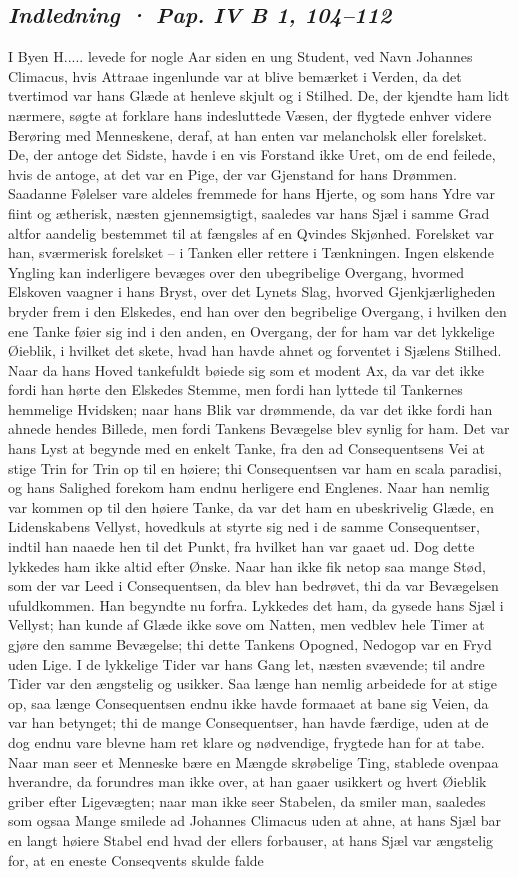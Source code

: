 \documentclass[12pt,a4paper]{article}
\newcommand{\sectionheading}[1]{\subsection*{\normalfont\itshape #1}}
\begin{document}
\sectionheading{Indledning  ·  Pap. IV B 1, 104–112}

I Byen H..... levede for nogle Aar siden en ung Student, ved Navn Johannes Climacus, hvis Attraae ingenlunde var at blive bemærket i Verden, da det tvertimod var hans Glæde at henleve skjult og i Stilhed. De, der kjendte ham lidt nærmere, søgte at forklare hans indesluttede Væsen, der flygtede enhver videre Berøring med Menneskene, deraf, at han enten var melancholsk eller forelsket. De, der antoge det Sidste, havde i en vis Forstand ikke Uret, om de end feilede, hvis de antoge, at det var en Pige, der var Gjenstand for hans Drømmen. Saadanne Følelser vare aldeles fremmede for hans Hjerte, og som hans Ydre var fiint og ætherisk, næsten gjennemsigtigt, saaledes var hans Sjæl i samme Grad altfor aandelig bestemmet til at fængsles af en Qvindes Skjønhed. Forelsket var han, sværmerisk forelsket – i Tanken eller rettere i Tænkningen. Ingen elskende Yngling kan inderligere bevæges over den ubegribelige Overgang, hvormed Elskoven vaagner i hans Bryst, over det Lynets Slag, hvorved Gjenkjærligheden bryder frem i den Elskedes, end han over den begribelige Overgang, i hvilken den ene Tanke føier sig ind i den anden, en Overgang, der for ham var det lykkelige Øieblik, i hvilket det skete, hvad han havde ahnet og forventet i Sjælens Stilhed. Naar da hans Hoved tankefuldt bøiede sig som et modent Ax, da var det ikke fordi han hørte den Elskedes Stemme, men fordi han lyttede til Tankernes hemmelige Hvidsken; naar hans Blik var drømmende, da var det ikke fordi han ahnede hendes Billede, men fordi Tankens Bevægelse blev synlig for ham. Det var hans Lyst at begynde med en enkelt Tanke, fra den ad Consequentsens Vei at stige Trin for Trin op til en høiere; thi Consequentsen var ham en scala paradisi, og hans Salighed forekom ham endnu herligere end Englenes. Naar han nemlig var kommen op til den høiere Tanke, da var det ham en ubeskrivelig Glæde, en Lidenskabens Vellyst, hovedkuls at styrte sig ned i de samme Consequentser, indtil han naaede hen til det Punkt, fra hvilket han var gaaet ud. Dog dette lykkedes ham ikke altid efter Ønske. Naar han ikke fik netop saa mange Stød, som der var Leed i Consequentsen, da blev han bedrøvet, thi da var Bevægelsen ufuldkommen. Han begyndte nu forfra. Lykkedes det ham, da gysede hans Sjæl i Vellyst; han kunde af Glæde ikke sove om Natten, men vedblev hele Timer at gjøre den samme Bevægelse; thi dette Tankens Opogned, Nedogop var en Fryd uden Lige. I de lykkelige Tider var hans Gang let, næsten svævende; til andre Tider var den ængstelig og usikker. Saa længe han nemlig arbeidede for at stige op, saa længe Consequentsen endnu ikke havde formaaet at bane sig Veien, da var han betynget; thi de mange Consequentser, han havde færdige, uden at de dog endnu vare blevne ham ret klare og nødvendige, frygtede han for at tabe. Naar man seer et Menneske bære en Mængde skrøbelige Ting, stablede ovenpaa hverandre, da forundres man ikke over, at han gaaer usikkert og hvert Øieblik griber efter Ligevægten; naar man ikke seer Stabelen, da smiler man, saaledes som ogsaa Mange smilede ad Johannes Climacus uden at ahne, at hans Sjæl bar en langt høiere Stabel end hvad der ellers forbauser, at hans Sjæl var ængstelig for, at en eneste Conseqvents skulde falde 
\end{document}
